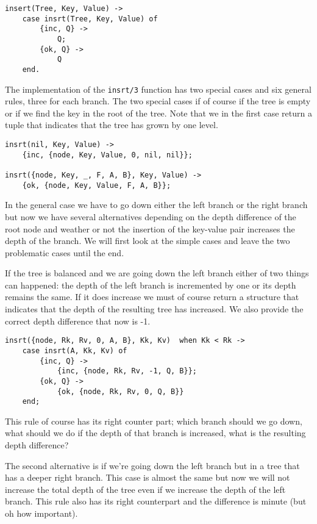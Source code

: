 \documentclass[a4paper,11pt]{article}
\begin{document}
\begin{lstlisting}
insert(Tree, Key, Value) ->
    case insrt(Tree, Key, Value) of
        {inc, Q} ->
            Q;
        {ok, Q} ->
            Q
    end.
\end{lstlisting}

The implementation of the {\tt insrt/3} function has two special cases
and six general rules, three for each branch. The two special cases if
of course if the tree is empty or if we find the key in the root of
the tree. Note that we in the first case return a tuple that indicates
that the tree has grown by one level.

\begin{lstlisting}
insrt(nil, Key, Value) ->
    {inc, {node, Key, Value, 0, nil, nil}};

insrt({node, Key, _, F, A, B}, Key, Value) ->
    {ok, {node, Key, Value, F, A, B}};
\end{lstlisting}

In the general case we have to go down either the left branch or the
right branch but now we have several alternatives depending on the
depth difference of the root node and weather or not the insertion of
the key-value pair increases the depth of the branch. We will first
look at the simple cases and leave the two problematic cases until the end.

If the tree is balanced and we are going down the left branch either
of two things can happened: the depth of the left branch is incremented
by one or its depth remains the same. If it does increase we must of
course return a structure that indicates that the depth of the
resulting tree has increased. We also provide the correct depth
difference that now is -1.

\begin{lstlisting}
insrt({node, Rk, Rv, 0, A, B}, Kk, Kv)  when Kk < Rk ->
    case insrt(A, Kk, Kv) of
        {inc, Q} ->
            {inc, {node, Rk, Rv, -1, Q, B}};
        {ok, Q} ->
            {ok, {node, Rk, Rv, 0, Q, B}}
    end;
\end{lstlisting}

This rule of course has its right counter part; which branch should we
go down, what should we do if the depth of that branch is increased,
what is the resulting depth difference?

The second alternative is if we're going down the left branch but in a
tree that has a deeper right branch. This case is almost the same but
now we will not increase the total depth of the tree even if we
increase the depth of the left branch. This rule also has its
right counterpart and the difference is minute (but oh how important).
\end{document}
